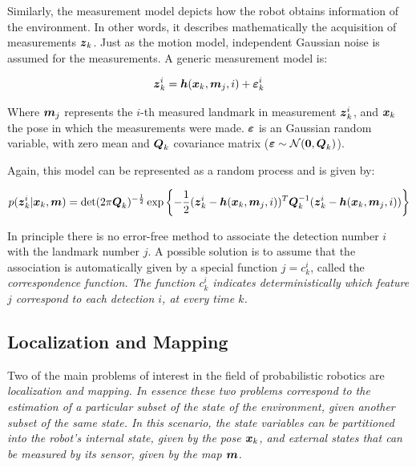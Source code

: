 Similarly, the measurement model depicts how the robot obtains information of the environment. In other words, it describes mathematically the acquisition of measurements $\boldsymbol{z}_k$. Just as the motion model, independent Gaussian noise is assumed for the measurements. A generic measurement model is:

\begin{equation}
\boldsymbol{z}_k^i = \boldsymbol{h}(\boldsymbol{x}_k,\boldsymbol{m}_j,i) + \boldsymbol{\varepsilon}_k^i
\label{eq:measurement-model}
\end{equation} 

\noindent
Where $\boldsymbol{m}_j$ represents the $i$-th measured landmark in measurement $\boldsymbol{z}_k^i$, and $\boldsymbol{x}_k$ the pose in which the measurements were made. $\boldsymbol{\varepsilon}$ is an Gaussian random variable, with zero mean and $\boldsymbol{Q}_k$ covariance matrix ($\boldsymbol{\varepsilon} \sim \mathcal{N}(\boldsymbol{0},\boldsymbol{Q}_k)$).

Again, this model can be represented as a random process and is given by:

\begin{equation}
p(\boldsymbol{z}_k^i|\boldsymbol{x}_k,\boldsymbol{m}) = \det(2\pi \boldsymbol{Q}_k)^{-\frac{1}{2}}\exp\left\lbrace -\frac{1}{2}(\boldsymbol{z}_k^i-\boldsymbol{h}(\boldsymbol{x}_k,\boldsymbol{m}_j,i))^T
\boldsymbol{Q}_k^{-1}(\boldsymbol{z}_k^i-\boldsymbol{h}(\boldsymbol{x}_k,\boldsymbol{m}_j,i))\right\rbrace 
\label{eq:measure-pdf}
\end{equation}

In principle there is no error-free method to associate the detection number $i$ with the landmark number $j$. A possible solution is to assume that the association is automatically given by a special function $j=c_k^i$, called the \it{correspondence function}. The function $c_k^i$ indicates deterministically which feature $j$ correspond to each detection $i$, at every time $k$.

\subsection{Localization and Mapping}

Two of the main problems of interest in the field of probabilistic robotics are \it{localization} and \it{mapping}. In essence these two problems correspond to the estimation of a particular subset of the state of the environment, given another subset of the same state. In this scenario, the state variables can be partitioned into the robot's internal state, given by the pose $\boldsymbol{x}_k$, and external states that can be measured by its sensor, given by the map $\boldsymbol{m}$.

